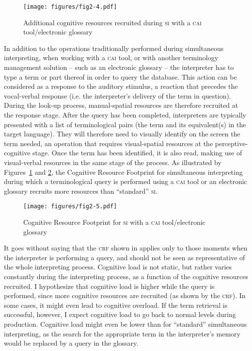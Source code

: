 \documentclass[output=paper]{langsci/langscibook}
\begin{document}
\begin{figure}[t]
        \texttt{[image: figures/fig2-4.pdf]}
\caption{Additional cognitive resources recruited during \textsc{si} with a \textsc{cai} tool/electronic glossary\label{fig:prandi:4}}
\end{figure}

In addition to the operations traditionally performed during simultaneous interpreting, when working with a \textsc{cai} tool, or with another terminology management solution -- such as an electronic glossary -- the interpreter has to type a term or part thereof in order to query the database. This action can be considered as a response to the auditory stimulus, a reaction that precedes the vocal-verbal response (i.e. the interpreter’s delivery of the term in question). During the look-up process, manual-spatial resources are therefore recruited at the response stage. After the query has been completed, interpreters are typically presented with a list of terminological pairs (the term and its equivalent(s) in the target language). They will therefore need to visually identify on the screen the term needed, an operation that requires visual-spatial resources at the perceptive-cognitive stage. Once the term has been identified, it is also read, making use of visual-verbal resources in the same stage of the process. As illustrated by Figures~\ref{fig:prandi:4} and \ref{fig:prandi:5}, the Cognitive Resource Footprint for simultaneous interpreting during which a terminological query is performed using a \textsc{cai} tool or an electronic glossary recruits more resources than ``standard'' \textsc{si}. 

\begin{figure}[t]
	\texttt{[image: figures/fig2-5.pdf]}
\caption{\label{fig:prandi:5}Cognitive Resource Footprint for \textsc{si} with a \textsc{cai} tool/electronic glossary}
\end{figure}

It goes without saying that the \textsc{crf} shown in  applies only to those moments when the interpreter is performing a query, and should not be seen as representative of the whole interpreting process. Cognitive load is not static, but rather varies constantly during the interpreting process, as a function of the cognitive resources recruited. I hypothesize that cognitive load is higher while the query is performed, since more cognitive resources are recruited (as shown by the \textsc{crf}). In some cases, it might even lead to cognitive overload. If the term retrieval is successful, however, I expect cognitive load to go back to normal levels during production. Cognitive load might even be lower than for ``standard'' simultaneous interpreting, as the search for the appropriate term in the interpreter’s memory would be replaced by a query in the glossary.
\end{document}
